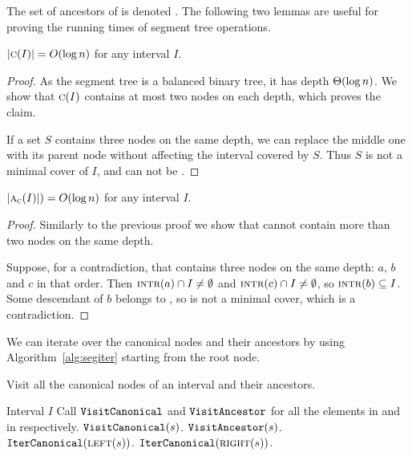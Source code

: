 \documentclass[english,gradu]{tktltiki2018}
\begin{document}
The set of ancestors of  is denoted .
The following two lemmas are useful for proving the running times of segment tree operations.

\begin{lem}\label{lem:canonlog}$\left |\textsc{c}(I)\right |=O(\log n)$ for any interval $I$.\end{lem}
\begin{proof}
As the segment tree is a balanced binary tree, it has depth $\Theta(\log n)$.
We show that $\textsc{c}(I)$ contains at most two nodes on each depth, which proves the claim.

If a set $S$ contains three nodes on the same depth, we can replace the middle one with its parent node without affecting the interval covered by $S$.
Thus $S$ is not a minimal cover of $I$, and can not be .
\end{proof}

\begin{lem}\label{lem:canonplog}$\left |\textsc{a}_{\textsc{c}}(I)\right |)=O(\log n)$ for any interval $I$.\end{lem}
\begin{proof}
Similarly to the previous proof we show that  cannot contain more than two nodes on the same depth.

Suppose, for a contradiction, that  contains three nodes on the same depth: $a$, $b$ and $c$ in that order.
Then $\textsc{intr}(a)\cap I\neq\emptyset$ and $\textsc{intr}(c)\cap I\neq\emptyset$, so $\textsc{intr}(b)\subseteq I$.
Some descendant of $b$ belongs to , so  is not a minimal cover, which is a contradiction.
\end{proof}

We can iterate over the canonical nodes and their ancestors by using Algorithm~\ref{alg:segiter} starting from the root node.

\begin{algorithm}
\caption{Visit all the canonical nodes of an interval and their ancestors.}\label{alg:segiter}
\begin{algorithmic}
\Require Interval $I$
\Ensure Call $\texttt{VisitCanonical}$ and $\texttt{VisitAncestor}$ for all the elements in  and in  respectively.
		\State $\texttt{VisitCanonical}(s)$.
		\State $\texttt{VisitAncestor}(s)$.
		\State $\texttt{IterCanonical}(\textsc{left}(s))$.
		\State $\texttt{IterCanonical}(\textsc{right}(s))$.
	\EndIf
\EndProcedure
\end{algorithmic}
\end{algorithm}
\end{document}
